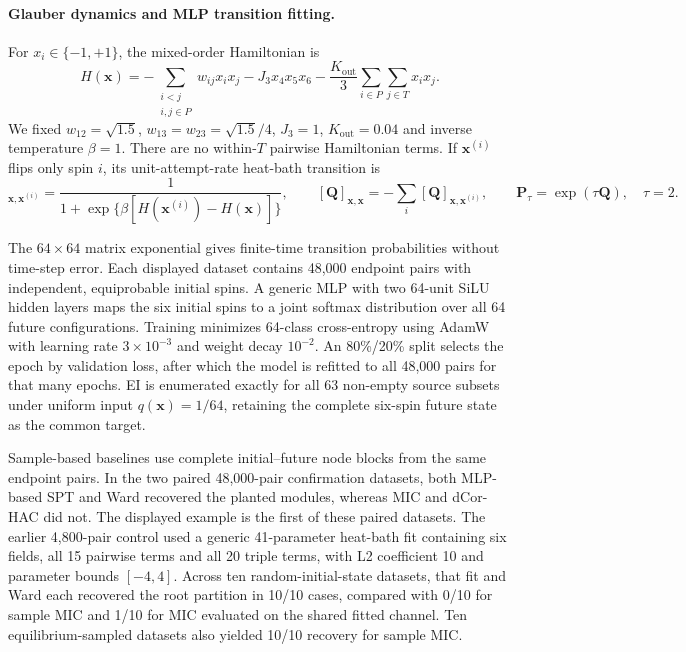 \documentclass[fleqn,10pt]{wlscirep}
\begin{document}
\paragraph{Glauber dynamics and MLP transition fitting.}
For $x_i\in\{-1,+1\}$, the mixed-order Hamiltonian is
\begingroup
\begin{equation}
H(\boldsymbol{x})=-\sum_{\substack{i<j\\ i,j\in P}}w_{ij}x_i x_j-J_3x_4x_5x_6
-\frac{K_{\mathrm{out}}}{3}\sum_{i\in P}\sum_{j\in T}x_i x_j.
\end{equation}
\endgroup
We fixed $w_{12}=\sqrt{1.5}$, $w_{13}=w_{23}=\sqrt{1.5}/4$, $J_3=1$, $K_{\mathrm{out}}=0.04$ and inverse temperature $\beta=1$. There are no within-$T$ pairwise Hamiltonian terms. If $\boldsymbol{x}^{(i)}$ flips only spin $i$, its unit-attempt-rate heat-bath transition is
\begingroup
\begin{equation}
[\mathbf Q]_{\boldsymbol{x},\boldsymbol{x}^{(i)}}=
\frac{1}{1+\exp\{\beta[H(\boldsymbol{x}^{(i)})-H(\boldsymbol{x})]\}},\qquad
[\mathbf Q]_{\boldsymbol{x},\boldsymbol{x}}=-\sum_i[\mathbf Q]_{\boldsymbol{x},\boldsymbol{x}^{(i)}},\qquad
\mathbf P_\tau=\exp(\tau\mathbf Q),\quad\tau=2.
\end{equation}
\endgroup

The $64\times64$ matrix exponential gives finite-time transition probabilities without time-step error. Each displayed dataset contains 48,000 endpoint pairs with independent, equiprobable initial spins. A generic MLP with two 64-unit SiLU hidden layers maps the six initial spins to a joint softmax distribution over all 64 future configurations. Training minimizes 64-class cross-entropy using AdamW with learning rate $3\times10^{-3}$ and weight decay $10^{-2}$. An 80\%/20\% split selects the epoch by validation loss, after which the model is refitted to all 48,000 pairs for that many epochs. EI is enumerated exactly for all 63 non-empty source subsets under uniform input $q(\boldsymbol{x})=1/64$, retaining the complete six-spin future state as the common target. 

Sample-based baselines use complete initial--future node blocks from the same endpoint pairs. In the two paired 48,000-pair confirmation datasets, both MLP-based SPT and Ward recovered the planted modules, whereas MIC and dCor-HAC did not. The displayed example is the first of these paired datasets. The earlier 4,800-pair control used a generic 41-parameter heat-bath fit containing six fields, all 15 pairwise terms and all 20 triple terms, with L2 coefficient 10 and parameter bounds $[-4,4]$. Across ten random-initial-state datasets, that fit and Ward each recovered the root partition in 10/10 cases, compared with 0/10 for sample MIC and 1/10 for MIC evaluated on the shared fitted channel. Ten equilibrium-sampled datasets also yielded 10/10 recovery for sample MIC.
\end{document}
